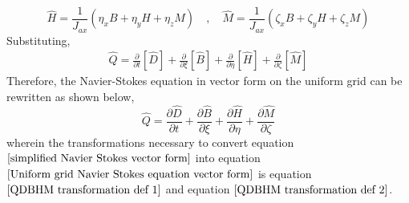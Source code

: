 \documentclass[a4paper, 12pt]{report}
\begin{document}
\begin{center}
\begin{equation}
\end{equation}
\begin{equation}
\hat{H} = \frac{1}{J_{ax}}\left(\eta_{x}B + \eta_{y}H + \eta_{z}M\right) \quad,\quad \hat{M} = \frac{1}{J_{ax}}\left(\zeta_{x}B + \zeta_{y}H + \zeta_{z}M\right)
\label{QDBHM transformation def 2}
\end{equation}
Substituting,
\begin{align*}
\hat{Q} = \frac{\partial }{\partial t}\left[\hat{D}\right] + \frac{\partial}{\partial \xi}\left[\hat{B}\right] + \frac{\partial}{\partial \eta}\left[\hat{H}\right] + \frac{\partial}{\partial \zeta}\left[\hat{M}\right]
\end{align*}
Therefore, the Navier-Stokes equation in vector form on the uniform grid can be rewritten as shown below,
\begin{equation}
\hat{Q} = \frac{\partial \hat{D}}{\partial t} + \frac{\partial \hat{B}}{\partial \xi} + \frac{\partial \hat{H}}{\partial \eta} + \frac{\partial \hat{M}}{\partial \zeta}
\label{Uniform grid Navier Stokes equation vector form}
\end{equation}
wherein the transformations necessary to convert equation $\ref{simplified Navier Stokes vector form}$ into equation $\ref{Uniform grid Navier Stokes equation vector form}$ is equation $\ref{QDBHM transformation def 1}$ and equation $\ref{QDBHM transformation def 2}$.


\end{center}
\end{document}
